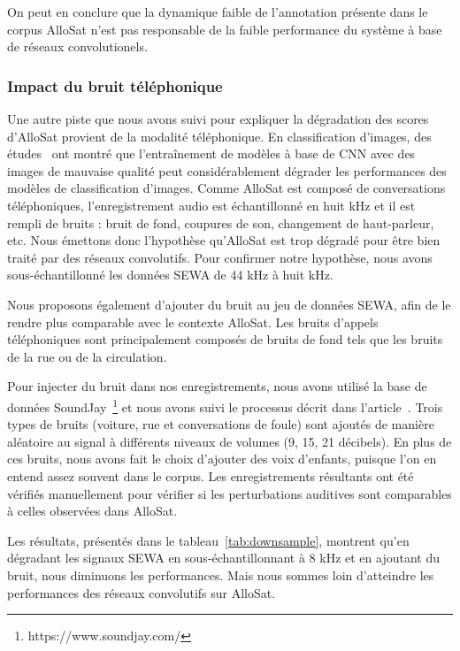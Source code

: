 

On peut en conclure que la dynamique faible de l'annotation présente dans le corpus AlloSat n'est pas responsable de la faible performance du système à base de réseaux convolutionels.

\subsubsection{Impact du bruit téléphonique}
Une autre piste que nous avons suivi pour expliquer la dégradation des scores d'AlloSat provient de la modalité téléphonique.
En classification d'images, des études~\cite{Roy2018,Dodge2016} ont montré que l'entraînement de modèles à base de CNN avec des images de mauvaise qualité peut considérablement dégrader les performances des modèles de classification d'images.
Comme AlloSat est composé de conversations téléphoniques, l'enregistrement audio est échantillonné en huit kHz et il est rempli de bruits : bruit de fond, coupures de son, changement de haut-parleur, etc. Nous émettons donc l'hypothèse qu'AlloSat est trop dégradé pour être bien traité par des réseaux convolutifs.
Pour confirmer notre hypothèse, nous avons sous-échantillonné les données SEWA de 44 kHz à huit kHz.

Nous proposons également d'ajouter du bruit au jeu de données SEWA, afin de le rendre plus comparable avec le contexte AlloSat. Les bruits d'appels téléphoniques sont principalement composés de bruits de fond tels que les bruits de la rue ou de la circulation.

Pour injecter du bruit dans nos enregistrements, nous avons utilisé la base de données SoundJay~\footnote{https://www.soundjay.com/} et nous avons suivi le processus décrit dans l'article~\cite{Alzqhoul2016}. Trois types de bruits (voiture, rue et conversations de foule) sont ajoutés de manière aléatoire au signal à différents niveaux de volumes (9, 15, 21 décibels). En plus de ces bruits, nous avons fait le choix d'ajouter des voix d'enfants, puisque l'on en entend assez souvent dans le corpus. Les enregistrements résultants ont été vérifiés manuellement pour vérifier si les perturbations auditives sont comparables à celles observées dans AlloSat.



Les résultats, présentés dans le tableau~\ref{tab:downsample}, montrent qu'en dégradant les signaux SEWA en sous-échantillonnant à 8 kHz et en ajoutant du bruit, nous diminuons les performances. Mais nous sommes loin d'atteindre les performances des réseaux convolutifs sur AlloSat.

